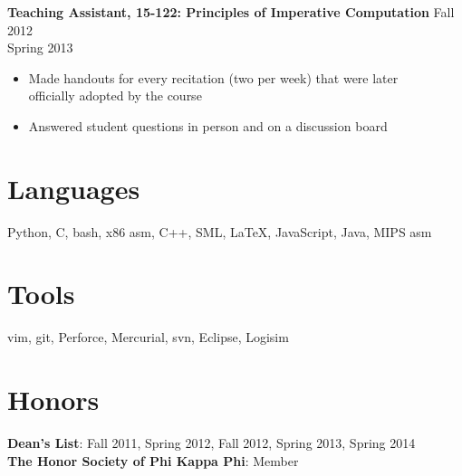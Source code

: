\documentclass[margin]{res}
\begin{document}
\begin{resume}
  \textbf{Teaching Assistant, 15-122: Principles of Imperative Computation}
    \hfill Fall 2012\\ \hphantom{1em} \hfill Spring 2013

  \vspace{-1em}\vspace{-1ex}
  \begin{itemize} \itemsep -2pt
    \item Made handouts for every recitation (two per week) that were later\\
      officially adopted by the course
    \item Answered student questions in person and on a discussion board
  \end{itemize}

\section{Languages}
  Python, C, bash, x86 asm, C++, SML, \LaTeX, JavaScript, Java, MIPS asm

\section{Tools}
  vim, git, Perforce, Mercurial, svn, Eclipse, Logisim

\section{Honors}
  \textbf{Dean's List}: Fall 2011, Spring 2012, Fall 2012, Spring 2013, Spring 2014 \\
  \textbf{The Honor Society of Phi Kappa Phi}: Member

\end{resume}
\end{document}
